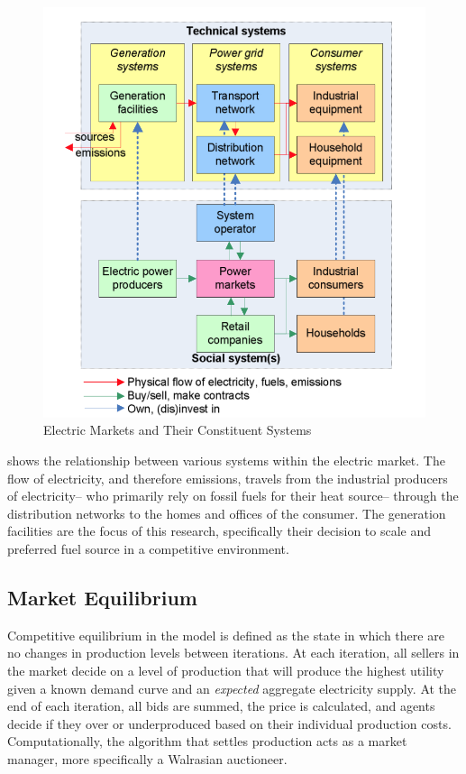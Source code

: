 \documentclass[12pt]{article}
\begin{document}
\begin{figure}[H]
	\begin{center}
	\includegraphics[scale = .3]{cetMarket}
	\caption{Electric Markets and Their Constituent Systems \cite{flowfig}}
	\label{cetMarket}
	\end{center}
\end{figure}

 shows the relationship between various systems within the electric market. The flow of electricity, and therefore emissions, travels from the industrial producers of electricity-- who primarily rely on fossil fuels for their heat source-- through the distribution networks to the homes and offices of the consumer. The generation facilities are the focus of this research, specifically their decision to scale and preferred fuel source in a competitive environment. 

\subsection{Market Equilibrium}
Competitive equilibrium in the model is defined as the state in which there are no changes in production levels between iterations. At each iteration, all sellers in the market decide on a level of production that will produce the highest utility given a known demand curve and an \emph{expected} aggregate electricity supply. At the end of each iteration, all bids are summed, the price is calculated, and agents decide if they over or underproduced based on their individual production costs. Computationally, the algorithm that settles production acts as a market manager, more specifically a Walrasian auctioneer.\*
\end{document}
